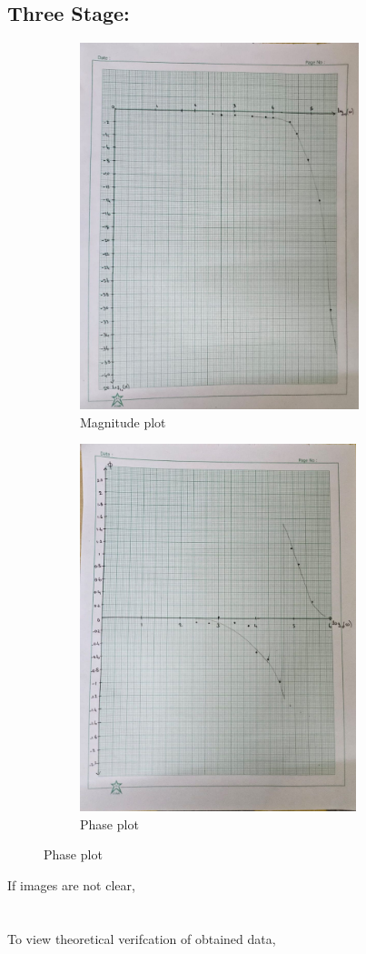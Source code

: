 \documentclass[a4paper,12pt]{article}
\begin{document}
\subsection{Three Stage:}
\pagebreak
\begin{figure}[h!]
	\begin{subfigure}[b]{100pt}
		\caption{Magnitude plot}
		\includegraphics[width = 230pt]{figs/fig5.png}
	\end{subfigure}
	\hspace{110pt}
	\begin{subfigure}[b]{100pt}
		\caption{Phase plot}
		\includegraphics[width = 228pt]{figs/fig6.png}
	\end{subfigure}
\end{figure}
If images are not clear,\\
\\\\
To view theoretical verifcation of obtained data,\\
\end{document}
